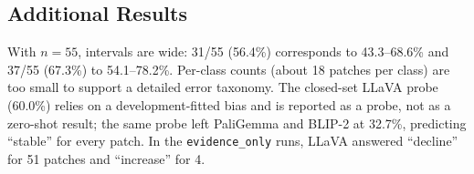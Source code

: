 \subsection{Additional Results}

With $n = 55$, intervals are wide: 31/55 (56.4\%) corresponds to
43.3--68.6\% and 37/55 (67.3\%) to 54.1--78.2\%. Per-class counts
(about 18 patches per class) are too small to support a detailed error
taxonomy. The closed-set LLaVA probe (60.0\%) relies on a
development-fitted bias and is reported as a probe, not as a zero-shot
result; the same probe left PaliGemma and BLIP-2 at 32.7\%, predicting
``stable'' for every patch. In the \texttt{evidence\_only} runs, LLaVA
answered ``decline'' for 51 patches and ``increase'' for 4.
